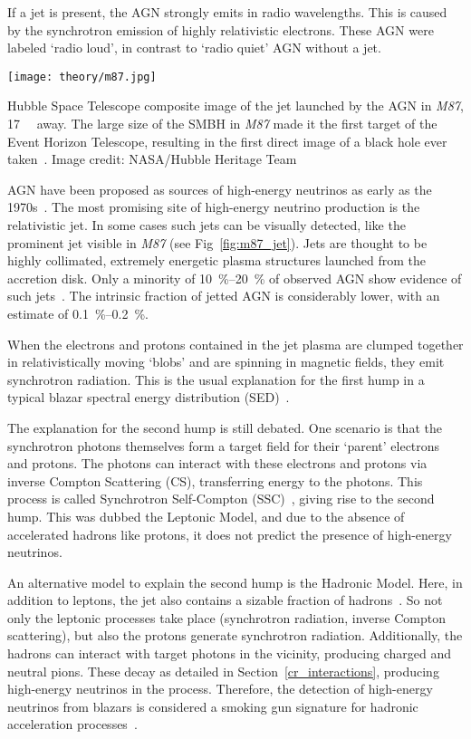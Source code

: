 If a jet is present, the AGN strongly emits in radio wavelengths. This is caused by the synchrotron emission of highly relativistic electrons. These AGN were labeled `radio loud', in contrast to `radio quiet' AGN without a jet.

\begin{marginfigure}
    \texttt{[image: theory/m87.jpg]}
    \caption[\textit{M87} jet]{Hubble Space Telescope composite image of the jet launched by the AGN in \textit{M87}, \SI{17}{\mega\parsec} away. The large size of the SMBH in \textit{M87} made it the first target of the Event Horizon Telescope, resulting in the first direct image of a black hole ever taken~\cite{Akiyama2019}. Image credit: NASA/Hubble Heritage Team}
\end{marginfigure}

AGN have been proposed as sources of high-energy neutrinos as early as the 1970s~. The most promising site of high-energy neutrino production is the relativistic jet. In some cases such jets can be visually detected, like the prominent jet visible in \textit{M87} (see Fig~\ref{fig:m87_jet}). Jets are thought to be highly collimated, extremely energetic plasma structures launched from the accretion disk. Only a minority of \SIrange{10}{20}{\percent} of observed AGN show evidence of such jets~. The intrinsic fraction of jetted AGN is considerably lower, with an estimate of \SIrange{0.1}{0.2}{\percent}.

When the electrons and protons contained in the jet plasma are clumped together in relativistically moving `blobs' and are spinning in magnetic fields, they emit synchrotron radiation. This is the usual explanation for the first hump in a typical blazar spectral energy distribution (SED)~.

The explanation for the second hump is still debated. One scenario is that the synchrotron photons themselves form a target field for their `parent' electrons and protons. The photons can interact with these electrons and protons via inverse Compton Scattering (CS), transferring energy to the photons. This process is called Synchrotron Self-Compton (SSC)~\cite{Spurio2018}, giving rise to the second hump. This was dubbed the Leptonic Model, and due to the absence of accelerated hadrons like protons, it does not predict the presence of high-energy neutrinos.

An alternative model to explain the second hump is the Hadronic Model. Here, in addition to leptons, the jet also contains a sizable fraction of hadrons~. So not only the leptonic processes take place (synchrotron radiation, inverse Compton scattering), but also the protons generate synchrotron radiation. Additionally, the hadrons can interact with target photons in the vicinity, producing charged and neutral pions. These decay as detailed in Section~\ref{cr_interactions}, producing high-energy neutrinos in the process. Therefore, the detection of high-energy neutrinos from blazars is considered a smoking gun signature for hadronic acceleration processes~.

